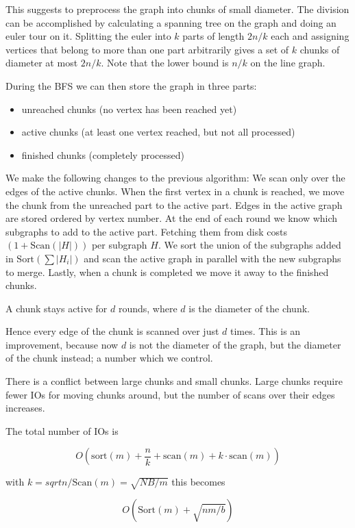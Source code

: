 This suggests to preprocess the graph into chunks of small diameter. The division can be accomplished by calculating a spanning tree on the graph and doing an euler tour on it. Splitting the euler into $k$ parts of length $2n/k$ each and assigning vertices that belong to more than one part arbitrarily gives a set of $k$ chunks of diameter at most $2n/k$. Note that the lower bound is $n/k$ on the line graph.

During the BFS we can then store the graph in three parts:

\begin{itemize}
\item unreached chunks (no vertex has been reached yet)
\item active chunks (at least one vertex reached, but not all processed)
\item finished chunks (completely processed)
\end{itemize}

We make the following changes to the previous algorithm: We scan only over the edges of the active chunks. When the first vertex in a chunk is reached, we move the chunk from the unreached part to the active part. Edges in the active graph are stored ordered by vertex number. At the end of each round we know which subgraphs to add to the active part. Fetching them from disk costs $(1+\text{Scan}(|H|))$ per subgraph $H$. We sort the union of the subgraphs added in $\text{Sort}(\sum |H_i|)$ and scan the active graph in parallel with the new subgraphs to merge. Lastly, when a chunk is completed we move it away to the finished chunks.

\begin{lem} A chunk stays active for $d$ rounds, where $d$ is the diameter of the chunk.
\end{lem}

Hence every edge of the chunk is scanned over just $d$ times. This is an improvement, because now $d$ is not the diameter of the graph, but the diameter of the chunk instead; a number which we control.

There is a conflict between large chunks and small chunks. Large chunks require fewer IOs for moving chunks around, but the number of scans over their edges increases.


\begin{thm} The total number of IOs is

\[O(\text{sort}(m) + \frac nk + \text{scan}(m) + k\cdot \text{scan}(m))\]

with $k= sqrt{n}/\text{Scan}(m) = \sqrt{NB/m}$ this becomes

\[O(\text{Sort}(m) + \sqrt{nm/b})\]
\end{thm}
